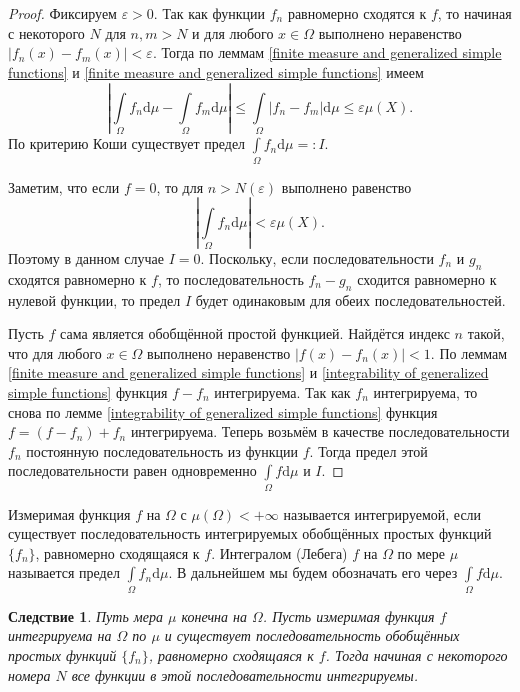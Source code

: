 \documentclass[12pt]{article}
\newtheorem{corollary}[theorem]{Следствие}
\numberwithin{theorem}{section}
\theoremstyle{definition}
\newcommand{\defin}[2]{\hypertarget{#2}{{\color{red} #1}}}
\newcommand{\diff}{\mathrm{d}}
\begin{document}
	\begin{proof}
		Фиксируем $ \varepsilon > 0 $.
		Так как функции $ f_n $ равномерно сходятся к $ f $, то начиная с некоторого $ N $
		для $ n, m > N $ и для любого $ x \in \Omega $ выполнено неравенство $ |f_n(x) - f_m(x)| < \varepsilon $.
		Тогда по леммам \ref{finite measure and generalized simple functions} и \ref{finite measure and generalized simple functions} имеем
		$$ \left|\int\limits_{\Omega} f_n\diff\mu - \int\limits_{\Omega} f_m\diff\mu\right| \leqslant \int\limits_{\Omega} |f_n - f_m|\diff\mu \leqslant \varepsilon \mu(X). $$
		По критерию Коши существует предел $ \int\limits_{\Omega} f_n \diff\mu =: I. $
		
		Заметим, что если $ f = 0 $, то для $ n > N(\varepsilon) $ выполнено равенство
		$$ \left|\int\limits_{\Omega} f_n\diff\mu\right| < \varepsilon\mu(X). $$
		Поэтому в данном случае $ I = 0 $. Поскольку, если последовательности $ f_n $ и $ g_n $ сходятся равномерно
		к $ f $, то последовательность $ f_n - g_n $ сходится равномерно к нулевой функции,
		то предел $ I $ будет одинаковым для обеих последовательностей.
		
		Пусть $ f $ сама является обобщённой простой функцией.
		Найдётся индекс $ n $ такой, что для любого $ x \in \Omega $
		выполнено неравенство $ |f(x) - f_n(x)| < 1 $.
		По леммам \ref{finite measure and generalized simple functions}
		и \ref{integrability of generalized simple functions}
		функция $ f - f_n $ интегрируема.
		Так как $ f_n $ интегрируема, то снова по лемме \ref{integrability of generalized simple functions} функция $ f = (f - f_n) + f_n $ интегрируема.
		Теперь возьмём в качестве последовательности $ f_n $ постоянную последовательность из функции $ f $.
		Тогда предел этой последовательности равен одновременно $ \int\limits_{\Omega} f\diff\mu $ и $ I $.
	\end{proof}
	
	Измеримая функция $ f $ на $ \Omega $ с $ \mu(\Omega) < +\infty $ называется \defin{интегрируемой}{integrable},
	если существует последовательность интегрируемых обобщённых простых функций $ \{f_n\} $,
	равномерно сходящаяся к $ f $. \defin{Интегралом (Лебега) $ f $ на $ \Omega $ по мере $ \mu $}{integral} 
	называется предел $ \int\limits_{\Omega} f_n \diff\mu $. В дальнейшем мы будем обозначать его через $ \int\limits_{\Omega} f\diff\mu $.
	
	\begin{corollary} \label{any sequence}
		Путь мера $ \mu $ конечна на $ \Omega $.
		Пусть измеримая функция $ f $ интегрируема на $ \Omega $ по $ \mu $
		и существует последовательность обобщённых простых функций $ \{f_n\} $, равномерно сходящаяся к $ f $.
		Тогда начиная с некоторого номера $ N $ все функции в этой последовательности интегрируемы.
	\end{corollary}
	
\end{document}

